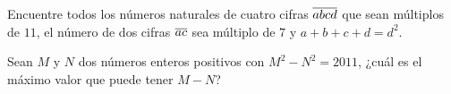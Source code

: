 \begin{problem}[OMAPA 2010/4]
Encuentre todos los números naturales de cuatro cifras $\overline{abcd}$ que
sean múltiplos de $11$, el número de dos cifras $\overline{ac}$ sea
múltiplo de $7$ y $a + b + c + d = d^2$.
\end{problem}

\begin{problem}
Sean $M$ y $N$ dos números enteros positivos
con $M^2 - N^2 = 2011$,
¿cuál es el máximo valor que puede tener $M - N$?
\end{problem}

